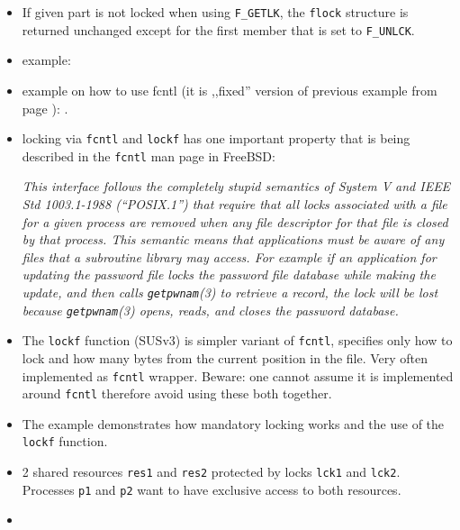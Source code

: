 \begin{itemize}
\item If given part is not locked when using \texttt{F\_GETLK},
the \texttt{flock} structure is returned unchanged except for the first member
that is set to \texttt{F\_UNLCK}.
\item \label{FCNTL_LOCKING} example: 
\item \label{FCNTL_FIXED_RACE_C} example on how to use fcntl (it is 
,,fixed'' version of previous  example from page
\pageref{RACE_C}): .
\item locking via \texttt{fcntl} and \texttt{lockf} has one important property
that is being described in the \texttt{fcntl} man page in FreeBSD:

\emph{This interface follows the completely stupid semantics of System V
and IEEE Std 1003.1-1988 (``POSIX.1'') that require that all locks
associated with a file for a given process are removed when any file
descriptor for that file is closed by that process. This semantic
means that applications must be aware of any files that a subroutine
library may access. For example if an application for updating the
password file locks the password file database while making the
update, and then calls \texttt{getpwnam}(3) to retrieve a record,
the lock will be lost because \texttt{getpwnam}(3) opens, reads, and
closes the password database.}
\item The \texttt{lockf} function (SUSv3) is simpler variant of
\texttt{fcntl}, specifies only how to lock and how many bytes from the current
position in the file. Very often implemented as \texttt{fcntl} wrapper.
Beware: one cannot assume it is implemented around \texttt{fcntl} therefore
avoid using these both together.
\item The example  demonstrates how mandatory
locking works and the use of the \texttt{lockf} function.
\end{itemize}




\begin{slide}
\begin{itemize}
\item 2 shared resources \texttt{res1} and \texttt{res2} protected by locks
\texttt{lck1} and \texttt{lck2}. Processes \texttt{p1} and
\texttt{p2} want to have exclusive access to both resources.
\end{itemize}
\begin{center}

\end{center}
\begin{itemize}
\item {}
\end{itemize}
\end{slide}

